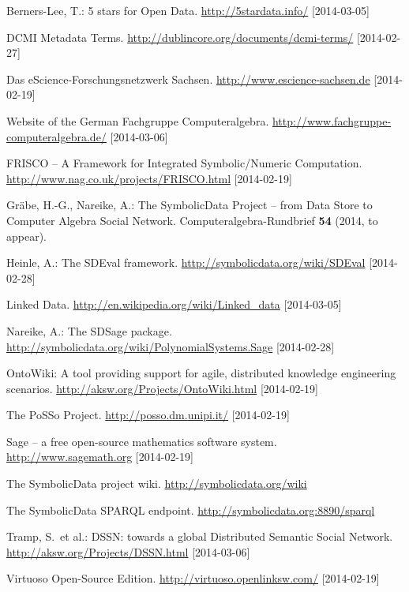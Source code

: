 \documentclass{llncs}
\newcommand{\SD}{{\sc SymbolicData}}
\begin{document}
\raggedright
\begin{thebibliography}{1}

 Berners-Lee, T.: 5 stars for Open Data.
  \url{http://5stardata.info/} [2014-03-05]

 DCMI Metadata Terms.
  \url{http://dublincore.org/documents/dcmi-terms/} [2014-02-27]

 Das eScience-Forschungsnetzwerk Sachsen.
  \newblock \url{http://www.escience-sachsen.de} [2014-02-19]

 Website of the German Fachgruppe Computeralgebra.  
  \url{http://www.fachgruppe-computeralgebra.de/} [2014-03-06]

 FRISCO -- A Framework for Integrated Symbolic/Numeric
  Computation. \url{http://www.nag.co.uk/projects/FRISCO.html} [2014-02-19]

 Gr\"abe, H.-G., Nareike, A.: The {\SD} Project
  -- from Data Store to Computer Algebra Social Network. 
  Computeralgebra-Rundbrief {\bf 54} (2014, to appear).

 Heinle, A.: The SDEval framework.  
  \url{http://symbolicdata.org/wiki/SDEval} [2014-02-28]

 Linked Data.  \url{http://en.wikipedia.org/wiki/Linked_data}
  [2014-03-05]

 Nareike, A.: The SDSage package.  
  \url{http://symbolicdata.org/wiki/PolynomialSystems.Sage} [2014-02-28]

 OntoWiki: A tool providing support for agile, distributed
  knowledge engineering scenarios. 
  \url{http://aksw.org/Projects/OntoWiki.html} [2014-02-19]

 The PoSSo Project. \url{http://posso.dm.unipi.it/}
  [2014-02-19]

 Sage -- a free open-source mathematics software system.
  \url{http://www.sagemath.org} [2014-02-19]

 The {\SD} project wiki.  \url{http://symbolicdata.org/wiki}

 The {\SD} SPARQL endpoint.
  \url{http://symbolicdata.org:8890/sparql}

 Tramp, S.\ et al.: DSSN: towards a global Distributed Semantic
  Social Network.  \url{http://aksw.org/Projects/DSSN.html} [2014-03-06]

 Virtuoso Open-Source Edition. \newblock
  \url{http://virtuoso.openlinksw.com/} [2014-02-19]

\end{thebibliography}
\end{document}
